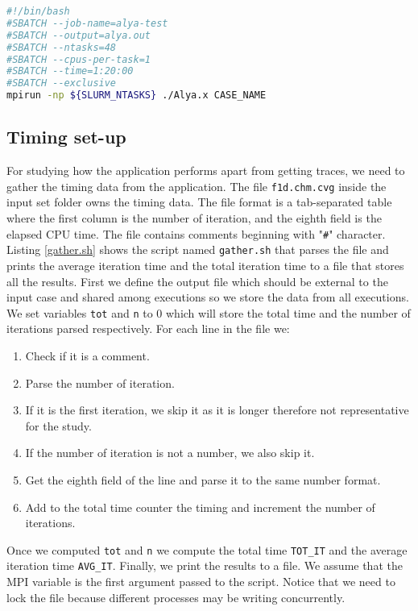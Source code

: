 \begin{lstlisting}[language=sh, caption={Running Alya with SLURM.}, label={jobalya}]
#!/bin/bash
#SBATCH --job-name=alya-test
#SBATCH --output=alya.out
#SBATCH --ntasks=48
#SBATCH --cpus-per-task=1
#SBATCH --time=1:20:00
#SBATCH --exclusive
mpirun -np ${SLURM_NTASKS} ./Alya.x CASE_NAME
\end{lstlisting}

\subsection{Timing set-up}

For studying how the application performs apart from getting traces, we need to gather the timing data from the application. The file \texttt{f1d.chm.cvg} inside the input set folder owns the timing data.  The file format is a tab-separated table where the first column is the number of iteration, and the eighth field is the elapsed CPU time.  The file contains comments beginning with "\texttt{\#}" character.  Listing \ref{gather.sh} shows the script named \texttt{gather.sh} that parses the file and prints the average iteration time and the total iteration time to a file that stores all the results. First we define the output file which should be external to the input case and shared among executions so we store the data from all executions. We set variables \texttt{tot} and \texttt{n} to 0 which will store the total time and the number of iterations parsed respectively. For each line in the file we:

\begin{enumerate}
  \item Check if it is a comment.
  \item Parse the number of iteration.
  \item If it is the first iteration, we skip it as it is longer therefore not representative for the study.
  \item If the number of iteration is not a number, we also skip it.
  \item Get the eighth field of the line and parse it to the same number format. 
  \item Add to the total time counter the timing and increment the number of iterations.
\end{enumerate}

Once we computed \texttt{tot} and \texttt{n} we compute the total time \texttt{TOT\_IT} and the average iteration time \texttt{AVG\_IT}. Finally, we print the results to a file. We assume that the MPI variable is the first argument passed to the script. Notice that we need to lock the file because different processes may be writing concurrently.

